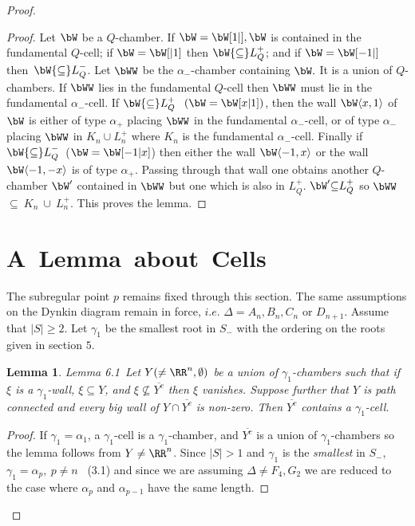 \documentclass{memo-l}
\newtheorem{lemma}[theorem]{Lemma}
\theoremstyle{definition}
\theoremstyle{remark}
\numberwithin{section}{chapter}
\numberwithin{equation}{chapter}
\begin{document}
\begin{proof}
\begin{proof}
\medpagebreak

   Let ${\bW}$ be a $Q$-chamber.  If $\bW = \bW[1\vert ],
\bW$ is contained in the fundamental $Q$-cell; if $\bW
= \bW [\vert 1]$ then $\bW {\subseteq} L_{Q}^{+}$; and if
$\bW = \bW [-1\vert ]$ then\ $\bW {\subseteq} L_{Q}^{-}$.
Let $\bWW$ be the ${\alpha}_{-}$-chamber
containing $\bW.$ It is a union of $Q$-chambers.  If
$\bWW$ lies in
the fundamental $Q$-cell then $\bWW$ must lie in the fundamental
${\alpha}_{-}$-cell.  If $\bW {\subseteq} L_{Q}^{+}$ $\ (\bW =
\bW [x\vert 1])$, then the wall $\bW \langle x,1\rangle $ of ${\bW}$
is either of type ${\alpha}_{+}$ placing $\bWW$
in the fundamental ${\alpha}_{-}$-cell, or
of type ${\alpha}_{-}$ placing $\bWW$ in
$K_{n} \cup L_{n}^{+}$ where $K_{n}$ is the fundamental
${\alpha}_{-}$-cell.  Finally if $\bW {\subseteq} L_{Q}^{-}$\
($\bW = \bW [-1\vert x]$) then either the wall
$\bW \langle -1,x\rangle $ or the wall $\bW \langle -1,-x\rangle $ is of type ${\alpha}_{+}$.
Passing through that wall one
obtains another $Q$-chamber $\bW'$ contained in
$\bWW$ but one which
is also in $L_{Q}^{+}$.  $\bW' {\subseteq} L_{Q}^{+}$ so
$\bWW$\ ${\subseteq}\ K_{n}\ \cup\ L_{n}^{+}$.  This
proves the lemma.
\end{proof}

\section{A\ Lemma\ about\ Cells}
\medpagebreak

   The subregular point $p$ remains fixed through this section.  The same
assumptions on the Dynkin diagram remain in force, $i.e$.  ${\Delta} =
A_{n}, B_{n}, C_{n}$ or $D_{n+1}$.  Assume that $\vert S\vert \ge 2$.
Let ${\gamma}_{1}$ be the smallest root in $S_{-}$ with the ordering on the
roots given in section $5$.

\medpagebreak

\begin{lemma}{Lemma 6.1}\ Let $Y(\ne {\RR}^{n},{\emptyset})$ be a union of
${\gamma}_{1}$-chambers such that if ${\xi}$ is a ${\gamma}_{1}$-wall,
${\xi} {\subseteq} Y$, and ${\xi} {\not\subseteq} \overline {Y^{c}}$ then ${\xi}$
vanishes.  Suppose further that $Y$ is path connected and every big wall of
$Y \cap \overline {Y^{c}}$ is non-zero.  Then $\overline {Y^{c}}$ contains a
${\gamma}_{1}$-cell.
\end{lemma}

\medpagebreak

\begin{proof}  If ${\gamma}_{1} = {\alpha}_{1}$, a ${\gamma}_{1}$-cell
is a ${\gamma}_{1}$-chamber, and $\overline {Y^{c}}$ is a union of
${\gamma}_{1}$-chambers so the lemma follows from $Y \ne {\RR}^{n}$.
Since $\vert S\vert >1$ and $\gamma_1$ is the {\it smallest\/} in $S_-$,\
${\gamma}_{1} = {\alpha}_{p},\  p \ne n$ \ (3.1) and since
we are assuming ${\Delta} \ne F_{4}, G_{2}$ we are reduced to the case where
${\alpha}_{p}$ and ${\alpha}_{p-1}$ have the same length.


\end{proof}
\end{proof}
\end{document}
